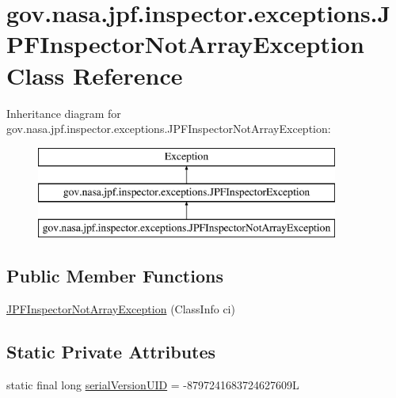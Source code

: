 \hypertarget{classgov_1_1nasa_1_1jpf_1_1inspector_1_1exceptions_1_1_j_p_f_inspector_not_array_exception}{}\section{gov.\+nasa.\+jpf.\+inspector.\+exceptions.\+J\+P\+F\+Inspector\+Not\+Array\+Exception Class Reference}
\label{classgov_1_1nasa_1_1jpf_1_1inspector_1_1exceptions_1_1_j_p_f_inspector_not_array_exception}
Inheritance diagram for gov.\+nasa.\+jpf.\+inspector.\+exceptions.\+J\+P\+F\+Inspector\+Not\+Array\+Exception\+:\begin{figure}[H]
\begin{center}
\leavevmode
\includegraphics[height=3.000000cm]{classgov_1_1nasa_1_1jpf_1_1inspector_1_1exceptions_1_1_j_p_f_inspector_not_array_exception}
\end{center}
\end{figure}
\subsection*{Public Member Functions}
\begin{DoxyCompactItemize}
\item 
\hyperlink{classgov_1_1nasa_1_1jpf_1_1inspector_1_1exceptions_1_1_j_p_f_inspector_not_array_exception_ae2eb47cb656992edc9b18c453a603d09}{J\+P\+F\+Inspector\+Not\+Array\+Exception} (Class\+Info ci)
\end{DoxyCompactItemize}
\subsection*{Static Private Attributes}
\begin{DoxyCompactItemize}
\item 
static final long \hyperlink{classgov_1_1nasa_1_1jpf_1_1inspector_1_1exceptions_1_1_j_p_f_inspector_not_array_exception_a85562b71ee21f8c15dd4a736f71aaf60}{serial\+Version\+U\+ID} = -\/8797241683724627609L
\end{DoxyCompactItemize}


